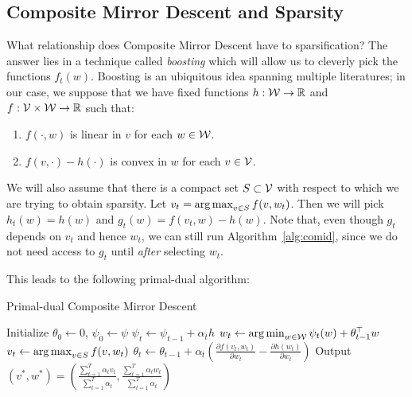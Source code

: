 \documentclass[paper.tex]{subfiles}
\begin{document}
\subsection{Composite Mirror Descent and Sparsity}
\label{sec:boosted}
What relationship does Composite Mirror Descent have to sparsification? The answer lies
in a technique called \emph{boosting} which will allow us to cleverly pick the functions 
$f_t(w)$. Boosting is an ubiquitous idea spanning multiple literatures; %
in our case, we suppose that we have fixed functions $h : \mathcal{W} \to \mathbb{R}$ and 
$f : \mathcal{V} \times \mathcal{W} \to \mathbb{R}$ such that:
\begin{enumerate}
\item $f(\cdot, w)$ is linear in $v$ for each $w \in \mathcal{W}$.
\item $f(v, \cdot) - h(\cdot)$ is convex in $w$ for each $v \in \mathcal{V}$.
\end{enumerate}
We will also assume that there is a compact set $S \subset \mathcal{V}$ with respect 
to which we are trying to obtain sparsity. Let 
$v_t = \argmax_{v \in S} f(v, w_t)$. Then we will pick 
$h_t(w) = h(w)$ and $g_t(w) = f(v_t, w) - h(w)$. Note that, 
even though $g_t$ depends on $v_t$ and hence $w_t$, we can still 
run Algorithm~\ref{alg:comid}, since we do not need access to $g_t$ 
until \emph{after} selecting $w_t$. 

This leads to the following primal-dual algorithm:
\begin{algorithm}
\caption{Primal-dual Composite Mirror Descent}
\label{alg:boosted-comid}
\begin{algorithmic}
\STATE Initialize $\theta_0 \gets 0$, $\psi_0 \gets \psi$
  \STATE $\psi_t \gets \psi_{t-1} + \alpha_t h$
  \STATE $w_t \gets \argmin_{w \in \W} \psi_t(w) + \theta_{t-1}^{\top} w$
  \STATE $v_t \gets \argmax_{v \in S} f(v, w_t)$
  \STATE $\theta_t \gets \theta_{t-1} + \alpha_t \left(\frac{\partial f(v_t, w_t)}{\partial w_t} - \frac{\partial h(w_t)}{\partial w_t}\right)$
\ENDFOR
\STATE Output $(v^*, w^*) = \left(\frac{\sum_{t=1}^T \alpha_t v_t}{\sum_{t=1}^T \alpha_t}, \frac{\sum_{t=1}^T \alpha_t w_t}{\sum_{t=1}^T \alpha_t}\right)$
\end{algorithmic}
\end{algorithm}
\end{document}
